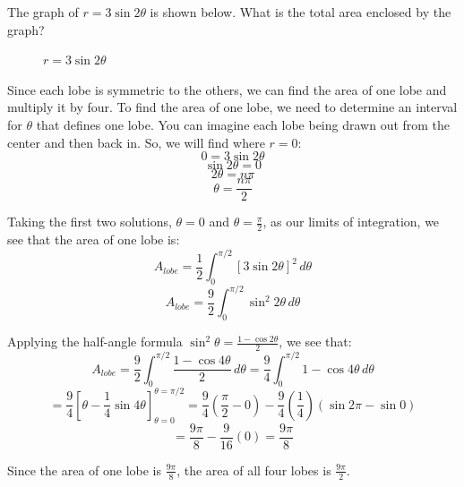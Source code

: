 \begin{Worked}
\begin{Problem}
The graph of $r = 3\sin{2\theta}$ is shown below. What is 
the total area enclosed by the graph?

\begin{figure}[H]
\centering
    \caption{$r = 3\sin{2\theta}$}
    \label{fig:fourlobe}
\end{figure}
\end{Problem}
\begin{Solution}
Since each lobe is symmetric to the others, we can find the 
area of one lobe and multiply it by four. To find the area of one lobe, we 
need to determine an interval for $\theta$ that defines one lobe. You can 
imagine each lobe being drawn out from the center and then back in. So, we will 
find where $r = 0$:
$$0 = 3\sin{2\theta}$$
$$\sin{2\theta} = 0$$
$$2\theta = n\pi$$
$$\theta = \frac{n\pi}{2}$$

Taking the first two solutions, $\theta = 0$ and $\theta = \frac{\pi}{2}$, as our 
limits of integration, we see that the area of one lobe is:
$$A_{lobe} = \frac{1}{2} \int_0^{\pi/2} \left[3 \sin{2 \theta} \right]^2\,d
\theta$$
$$A_{lobe} = \frac{9}{2} \int_0^{\pi/2} \sin^2{2\theta}\,d\theta$$

Applying the half-angle formula $\sin^2{\theta} = \frac{1 - \cos{2\theta}}{2}$, 
we see that:
$$A_{lobe} = \frac{9}{2} \int_0^{\pi/2} \frac{1 - \cos{4\theta}}{2}\,d\theta = 
\frac{9}{4} \int_0^{\pi / 2} 1 - \cos{4\theta} \, d\theta$$
$$= \frac{9}{4} \left[ \theta - \frac{1}{4} \sin{4\theta} \right]_{\theta = 0}^
{\theta = \pi / 2} = \frac{9}{4} \left( \frac{\pi}{2} - 0 \right) - \frac{9}{4}
\left( \frac{1}{4} \right) \left( \sin{2\pi} - \sin{0} \right)$$
$$= \frac{9\pi}{8} - \frac{9}{16} \left( 0 \right) = \frac{9\pi}{8}$$

Since the area of one lobe is $\frac{9\pi}{8}$, the area of all four lobes is 
$\frac{9\pi}{2}$.
\end{Solution}
\end{Worked}

